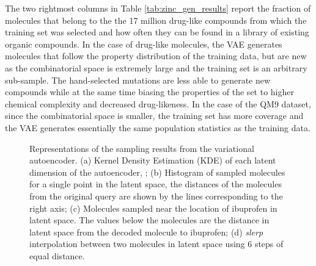 \documentclass[journal=acscii,manuscript=article]{achemso}
\newcommand{\sidecaption}[1]%
{\raisebox{\abovecaptionskip}{\begin{subfigure}[t]{1.6em}
  \caption[singlelinecheck=off]{}%
  \label{#1}
\end{subfigure}}\ignorespaces}
\begin{document}
The two rightmost columns in Table \ref{tab:zinc_gen_results} report the fraction of molecules that belong to the the 17 million drug-like compounds from which the training set was selected and how often they can be found in a library of existing organic compounds. In the case of drug-like molecules, the VAE generates molecules that follow the property distribution of the training data, but are new as the combinatorial space is extremely large and the training set is an arbitrary sub-sample. The hand-selected mutations are less able to generate new compounds while at the same time biasing the properties of the set to higher chemical complexity and decreased drug-likeness. In the case of the QM9 dataset, since the combinatorial space is smaller, the training set has more coverage and the VAE generates essentially the same population statistics as the training data.
 
\begin{figure}[ht]
	\centering
	\sidecaption{subfig:a}
	\hfill
	\sidecaption{subfig:b}
	
	\vspace{1.5cm}
	
	\sidecaption{subfig:c}
	
	\vspace{1.5cm}
	
	\sidecaption{subfig:d}	

    \caption{Representations of the sampling results from the variational autoencoder. (a) Kernel Density Estimation (KDE) of each latent dimension of the autoencoder, ; (b) Histogram of sampled molecules for a single point in the latent space, the distances of the molecules from the original query are shown by the lines corresponding to the right axis; (c) Molecules sampled near the location of ibuprofen in latent space. The values below the molecules are the distance in latent space from the decoded molecule to ibuprofen; (d) \textit{slerp} interpolation between two molecules in latent space using 6 steps of equal distance.} 
    \label{fig:interpolation_figures}
\end{figure}
\end{document}

